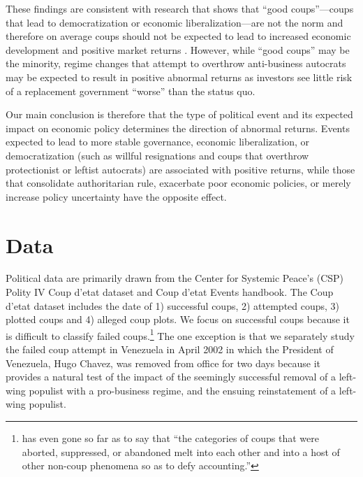 \documentclass[12pt,final,fleqn]{article}
\theoremstyle{plain}
\begin{document}
These findings are consistent with research that shows that ``good coups''---coups that lead to democratization or economic liberalization---are not the norm and therefore on average coups should not be expected to lead to increased economic development and positive market returns \citep{derpanopoulos2015coups, marinov2014coups, powell2011global, thyne2016coup, varol2011democratic}. However, while ``good coups'' may be the minority, regime changes that attempt to overthrow anti-business autocrats may be expected to result in positive abnormal returns as investors see little risk of a replacement government ``worse'' than the status quo.

Our main conclusion is therefore that the type of political event and its expected impact on economic policy determines the direction of abnormal returns. Events expected to lead to more stable governance, economic liberalization, or democratization (such as willful resignations and coups that overthrow protectionist or leftist autocrats) are associated with positive returns, while those that consolidate authoritarian rule, exacerbate poor economic policies, or merely increase policy uncertainty have the opposite effect.

\section{Data}
Political data are primarily drawn from the Center for Systemic Peace's (CSP) Polity IV Coup d'etat dataset and Coup d'etat Events handbook. The Coup d'etat dataset includes the date of 1) successful coups, 2) attempted coups, 3) plotted coups and 4) alleged coup plots. We focus on successful coups because it is difficult to classify failed coups.\footnote{\citet[p. 617]{needler1966political} has even gone so far as to say that ``the categories of coups that were aborted, suppressed, or abandoned melt into each other and into a host of other non-coup phenomena so as to defy accounting.''} The one exception is that we separately study the failed coup attempt in Venezuela in April 2002 in which the President of Venezuela, Hugo Chavez, was removed from office for two days because it provides a natural test of the impact of the seemingly successful removal of a left-wing populist with a pro-business regime, and the ensuing reinstatement of a left-wing populist. 
\end{document}
